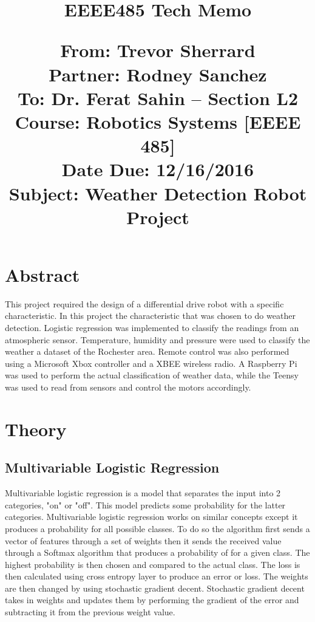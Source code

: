 \documentclass[UTF8]{article}
\begin{document}
\title{%
 \Huge \textbf{EEEE485 Tech Memo}  \\
  \begin{flushleft}
   \Large \textbf{From:} Trevor Sherrard \\
         \textbf{Partner:} Rodney Sanchez  \\
         \textbf{To:}  Dr. Ferat Sahin -- Section L2 \\
         \textbf{Course:} Robotics Systems [EEEE 485] \\
         \textbf{Date Due:} 12/16/2016 \\
		 \textbf{Subject:} Weather Detection Robot Project
		 \end{flushleft}}
\maketitle
\newpage

\section{Abstract}
This project required the design of a differential drive robot with a specific characteristic. In this project the characteristic that was chosen to do weather detection. Logistic regression was implemented to classify the readings from an atmospheric sensor. Temperature, humidity and pressure were used to classify the weather a dataset of the Rochester area. Remote control was also performed using a Microsoft Xbox controller and a XBEE wireless radio. A Raspberry Pi was used to perform the actual classification of weather data, while the Teensy was used to read from sensors and control the motors accordingly.

\section{Theory}

\subsection{Multivariable Logistic Regression}
Multivariable logistic regression is a model that separates the input into 2 categories, "on" or "off". This model predicts some probability for the latter categories. Multivariable logistic regression works on similar concepts except it produces a probability for all possible classes. To do so the algorithm first sends a vector of features through a set of weights then it sends the received value through a Softmax algorithm that produces a probability of for a given class. The highest probability is then chosen and compared to the actual class. The loss is then calculated using cross entropy layer to produce an error or loss. The weights are then changed by using stochastic gradient decent. Stochastic gradient decent takes in weights and updates them by performing the gradient of the error and subtracting it from the previous weight value.
\end{document}
